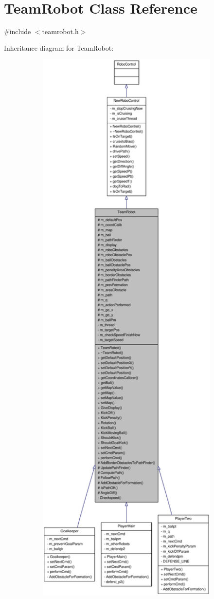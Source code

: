 \hypertarget{classTeamRobot}{
\section{TeamRobot Class Reference}
\label{classTeamRobot}
}


{\ttfamily \#include $<$teamrobot.h$>$}



Inheritance diagram for TeamRobot:\nopagebreak
\begin{figure}[H]
\begin{center}
\leavevmode
\includegraphics[width=400pt]{classTeamRobot__inherit__graph}
\end{center}
\end{figure}

